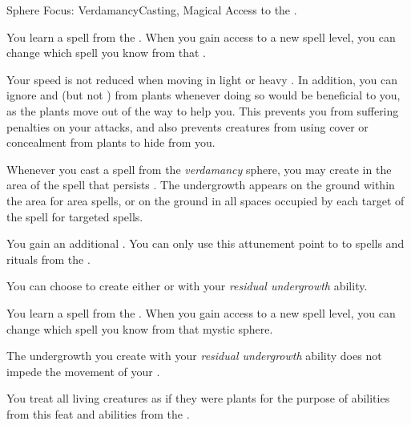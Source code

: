     \begin{feat}{Sphere Focus: Verdamancy}{Casting, Magical}
        \featpre Access to the  .

         You learn a spell from the  .
        When you gain access to a new spell level, you can change which spell you know from that .

         Your speed is not reduced when moving in light or heavy .
        In addition, you can ignore  and  (but not ) from plants whenever doing so would be beneficial to you, as the plants move out of the way to help you.
        This prevents you from suffering penalties on your attacks, and also prevents creatures from using cover or concealment from plants to hide from you.

         Whenever you cast a spell from the \textit{verdamancy} sphere, you may create  in the area of the spell that persists .
        The undergrowth appears on the ground within the area for area spells, or on the ground in all spaces occupied by each target of the spell for targeted spells.

         You gain an additional .
        You can only use this attunement point to  to spells and rituals from the  .

         You can choose to create either  or  with your \textit{residual undergrowth} ability.

         You learn a spell from the  .
        When you gain access to a new spell level, you can change which spell you know from that mystic sphere.

         The undergrowth you create with your \textit{residual undergrowth} ability does not impede the movement of your .

         You treat all living creatures as if they were plants for the purpose of abilities from this feat and abilities from the  .
    \end{feat}

